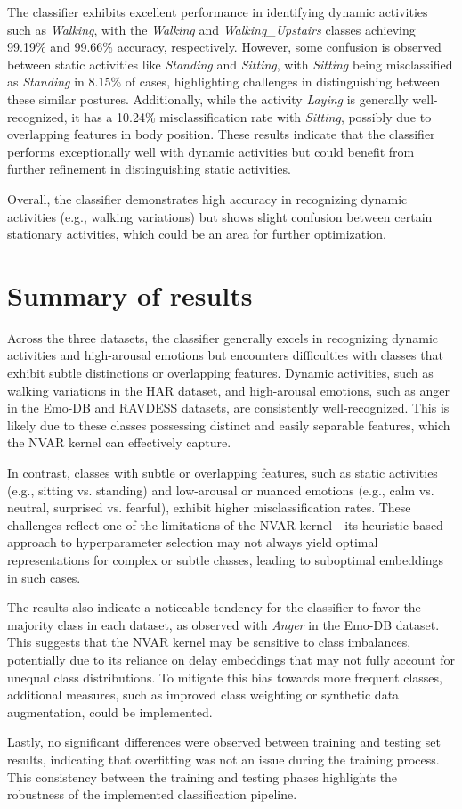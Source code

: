The classifier exhibits excellent performance in identifying dynamic activities such as \textit{Walking}, with the \textit{Walking} and \textit{Walking\_Upstairs} classes achieving 99.19\% and 99.66\% accuracy, respectively. However, some confusion is observed between static activities like \textit{Standing} and \textit{Sitting}, with \textit{Sitting} being misclassified as \textit{Standing} in 8.15\% of cases, highlighting challenges in distinguishing between these similar postures. Additionally, while the activity \textit{Laying} is generally well-recognized, it has a 10.24\% misclassification rate with \textit{Sitting}, possibly due to overlapping features in body position. These results indicate that the classifier performs exceptionally well with dynamic activities but could benefit from further refinement in distinguishing static activities.

Overall, the classifier demonstrates high accuracy in recognizing dynamic activities (e.g., walking variations) but shows slight confusion between certain stationary activities, which could be an area for further optimization.

\section{Summary of results}

Across the three datasets, the classifier generally excels in recognizing dynamic activities and high-arousal emotions but encounters difficulties with classes that exhibit subtle distinctions or overlapping features. Dynamic activities, such as walking variations in the HAR dataset, and high-arousal emotions, such as anger in the Emo-DB and RAVDESS datasets, are consistently well-recognized. This is likely due to these classes possessing distinct and easily separable features, which the NVAR kernel can effectively capture.

In contrast, classes with subtle or overlapping features, such as static activities (e.g., sitting vs. standing) and low-arousal or nuanced emotions (e.g., calm vs. neutral, surprised vs. fearful), exhibit higher misclassification rates. These challenges reflect one of the limitations of the NVAR kernel—its heuristic-based approach to hyperparameter selection may not always yield optimal representations for complex or subtle classes, leading to suboptimal embeddings in such cases.

The results also indicate a noticeable tendency for the classifier to favor the majority class in each dataset, as observed with \textit{Anger} in the Emo-DB dataset. This suggests that the NVAR kernel may be sensitive to class imbalances, potentially due to its reliance on delay embeddings that may not fully account for unequal class distributions. To mitigate this bias towards more frequent classes, additional measures, such as improved class weighting or synthetic data augmentation, could be implemented.

Lastly, no significant differences were observed between training and testing set results, indicating that overfitting was not an issue during the training process. This consistency between the training and testing phases highlights the robustness of the implemented classification pipeline.
